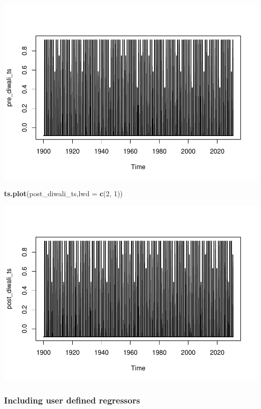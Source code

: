 \documentclass[
]{article}
\newenvironment{Shaded}{\begin{snugshade}}{\end{snugshade}}
\newcommand{\AttributeTok}[1]{\textcolor[rgb]{0.13,0.29,0.53}{#1}}
\newcommand{\DecValTok}[1]{\textcolor[rgb]{0.00,0.00,0.81}{#1}}
\newcommand{\FunctionTok}[1]{\textcolor[rgb]{0.13,0.29,0.53}{\textbf{#1}}}
\newcommand{\NormalTok}[1]{#1}
\begin{document}
\includegraphics{regressors_of_diwali_seasonality_for_industrial_production_files/figure-latex/unnamed-chunk-7-1.pdf}

\begin{Shaded}
\begin{Highlighting}[]
\FunctionTok{ts.plot}\NormalTok{(post\_diwali\_ts,}\AttributeTok{lwd =} \FunctionTok{c}\NormalTok{(}\DecValTok{2}\NormalTok{, }\DecValTok{1}\NormalTok{))}
\end{Highlighting}
\end{Shaded}

\includegraphics{regressors_of_diwali_seasonality_for_industrial_production_files/figure-latex/unnamed-chunk-7-2.pdf}

\hypertarget{including-user-defined-regressors}{%
\subsubsection{Including user defined
regressors}\label{including-user-defined-regressors}}
\end{document}
